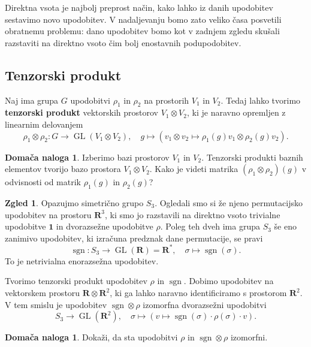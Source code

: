 \documentclass[11pt]{book}
\def\RR{\mathbf{R}}
\def\oneone{\mathbf{1}}
\DeclareMathOperator\sgn{sgn}
\DeclareMathOperator\GL{GL}
\def\definicija{\color{rdeca}\bf}
\theoremstyle{definition}
\theoremstyle{zgled}
\newtheorem{zgled}[theorem]{Zgled}
\theoremstyle{zgledbrezstevilke}
\theoremstyle{odprtproblem}
\theoremstyle{domacanaloga}
\newtheorem{domacanaloga}[theorem]{Domača naloga}
\theoremstyle{izrek}
\begin{document}
Direktna vsota je najbolj preprost način, kako lahko iz danih upodobitev sestavimo novo upodobitev. V nadaljevanju bomo zato veliko časa posvetili obratnemu problemu: dano upodobitev bomo kot v zadnjem zgledu skušali razstaviti na direktno vsoto čim bolj enostavnih podupodobitev.

\subsection{Tenzorski produkt}

Naj ima grupa $G$ upodobitvi $\rho_1$ in $\rho_2$ na prostorih $V_1$ in $V_2$. Tedaj lahko tvorimo {\definicija tenzorski produkt} vektorskih prostorov $V_1 \otimes V_2$, ki je naravno opremljen z linearnim delovanjem
\[
    \rho_1 \otimes \rho_2 \colon G \to \GL(V_1 \otimes V_2), \quad
    g \mapsto \left( v_1 \otimes v_2 \mapsto \rho_1(g) v_1 \otimes \rho_2(g) v_2 \right).
\]

\begin{domacanaloga}
Izberimo bazi prostorov $V_1$ in $V_2$. Tenzorski produkti baznih elementov tvorijo bazo prostora $V_1 \otimes V_2$. Kako je videti matrika $(\rho_1 \otimes \rho_2)(g)$ v odvisnosti od matrik $\rho_1(g)$ in $\rho_2(g)$?
\end{domacanaloga}

\begin{zgled}
Opazujmo simetrično grupo $S_3$. Ogledali smo si že njeno permutacijsko upodobitev na prostoru $\RR^3$, ki smo jo razstavili na direktno vsoto trivialne upodobitve $\oneone$ in dvorazsežne upodobitve $\rho$. Poleg teh dveh ima grupa $S_3$ še eno zanimivo upodobitev, ki izračuna predznak dane permutacije, se pravi
\[
    \sgn \colon S_3 \to \GL(\RR) = \RR^*, \quad
    \sigma \mapsto \sgn(\sigma).
\]
To je netrivialna enorazsežna upodobitev.

Tvorimo tenzorski produkt upodobitev $\rho$ in $\sgn$. Dobimo upodobitev na vektorskem prostoru $\RR \otimes \RR^2$, ki ga lahko naravno identificiramo s prostorom $\RR^2$. V tem smislu je upodobitev $\sgn \otimes \rho$ izomorfna dvorazsežni upodobitvi
\[
    S_3 \to \GL(\RR^2), \quad
    \sigma \mapsto \left( v \mapsto \sgn(\sigma) \cdot \rho(\sigma) \cdot v \right).
\]
\begin{domacanaloga}
    Dokaži, da sta upodobitvi $\rho$ in $\sgn \otimes \rho$ izomorfni.
\end{domacanaloga}
\end{zgled}
\end{document}
